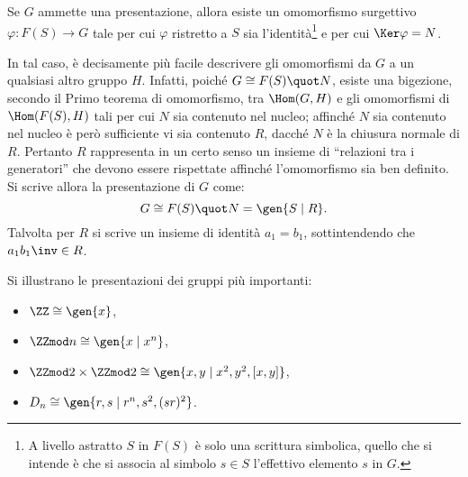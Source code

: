 \documentclass[12pt]{scrartcl}
\begin{document}
	
	Se $G$ ammette una presentazione, allora esiste un
	omomorfismo surgettivo $\varphi : F(S) \to G$ tale
	per cui $\varphi$ ristretto a $S$ sia l'identità\footnote{
		A livello astratto $S$ in $F(S)$ è solo una scrittura
		simbolica, quello che si intende è che si associa
		al simbolo $s \in S$ l'effettivo elemento $s$ in
		$G$.
	} e per cui $\Ker \varphi = N$. \medskip
	
	
	In tal caso, è decisamente più facile descrivere gli
	omomorfismi da $G$ a un qualsiasi altro gruppo $H$.
	Infatti, poiché $G \cong F(S) \quot N$, esiste una bigezione,
	secondo il Primo teorema di omomorfismo, tra
	$\Hom(G, H)$ e gli omomorfismi di $\Hom(F(S), H)$ tali
	per cui $N$ sia contenuto nel nucleo; affinché $N$
	sia contenuto nel nucleo è però sufficiente
	vi sia contenuto $R$, dacché $N$ è la chiusura normale
	di $R$. Pertanto $R$ rappresenta in un certo senso un
	insieme di ``relazioni tra i generatori'' che devono
	essere rispettate affinché l'omomorfismo sia ben definito.
	Si scrive allora la presentazione di $G$ come:
	\[ G \cong F(S) \quot N = \gen{S \mid R}. \]
	Talvolta per $R$ si scrive un insieme di identità
	$a_1 = b_1$, sottintendendo che
	$a_1 b_1\inv \in R$.
	
	\begin{example}
		Si illustrano le presentazioni dei gruppi
		più importanti:
		
		\begin{itemize}
			\item $\ZZ \cong \gen{x}$,
			\item $\ZZmod n \cong \gen{x \mid x^n}$,
			\item $\ZZmod 2 \times \ZZmod 2 \cong \gen{x, y \mid x^2, y^2, [x, y]}$,
			\item $D_n \cong \gen{r, s \mid r^n, s^2, (sr)^2}$.
		\end{itemize}
	\end{example}
\end{document}

